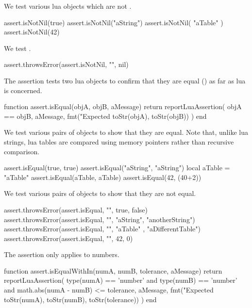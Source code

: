We test various lua objects which are not .

\startLuaTest
  assert.isNotNil(true)
  assert.isNotNil("aString")
  assert.isNotNil({ "aTable" })
  assert.isNotNil(42)
\stopLuaTest
\stopTestCase


We test .

\startLuaTest
  assert.throwsError(assert.isNotNil, "", nil)
\stopLuaTest
\stopTestCase

\stopTestSuite


The  assertion tests two lua objects to confirm that 
they are equal (\type{==}) as far as lua is concerned. 

\startLuaCode
function assert.isEqual(objA, objB, aMessage)
  return reportLuaAssertion(
    objA == objB,
    aMessage,
    fmt("Expected %
      toStr(objA), toStr(objB))
  )
end
\stopLuaCode


We test various pairs of objects to show that they are equal. Note that, 
unlike lua strings, lua tables are compared using memory pointers rather 
than recursive comparison. 

\startLuaTest
  assert.isEqual(true, true)
  assert.isEqual("aString", "aString")
  local aTable = { "aTable" }
  assert.isEqual(aTable, aTable)
  assert.isEqual(42, (40+2))
\stopLuaTest
\stopTestCase


We test various pairs of objects to show that they are not equal. 

\startLuaTest
  assert.throwsError(assert.isEqual, "", true, false)
  assert.throwsError(assert.isEqual, "",
    "aString", "anotherString")
  assert.throwsError(assert.isEqual, "",
    { "aTable" }, { "aDifferentTable"})
  assert.throwsError(assert.isEqual, "", 42, 0)
\stopLuaTest
\stopTestCase

\stopTestSuite


The  assertion only applies to numbers.

\startLuaCode
function assert.isEqualWithIn(numA, numB,
  tolerance, aMessage)
  return reportLuaAssertion(
    type(numA) == 'number' and type(numB) == 'number'
    and math.abs(numA - numB) <= tolerance,
    aMessage,
    fmt("Expected %
      toStr(numA), toStr(numB), toStr(tolerance))
  )
end
\stopLuaCode

